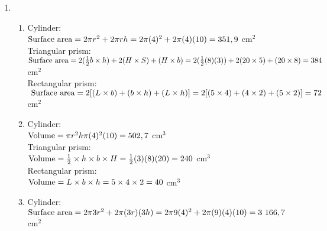  \begin{eocsolutions}{}{
\begin{enumerate}[itemsep=5pt, label=\textbf{\arabic*}. ] 
\item \begin{enumerate}[itemsep=5pt, label=\textbf{(\alph*)} ]
       \item Cylinder: \\
$\mbox{Surface area} = 2 \pi r^2 + 2 \pi rh \\
= 2 \pi (4)^2 + 2 \pi(4)(10) \\
= 351,9 ~$cm$^{2}$\\

Triangular prism:  \\
$\mbox{Surface area} = 2(\frac{1}{2}b \times h) + 2(H \times S) + (H \times b)\\
= 2(\frac{1}{2}(8)(3)) + 2(20 \times 5) + (20 \times 8)\\
= 384 ~$cm$^{2}$\\

Rectangular prism:\\
$\mbox{ Surface area} = 2[(L \times b) + (b \times h) + (L \times h)] \\
= 2[(5 \times 4) + (4 \times 2) + (5 \times 2)] \\
= 72 ~$cm$^{2}$

\item Cylinder: \\
$\mbox{Volume} = \pi r^2 h \\
\pi (4)^2(10)\\
= 502,7 ~$cm$^{3}$ \\

Triangular prism:  \\
$\mbox{Volume} = \frac{1}{2} \times h \times b \times H\\
= \frac{1}{2}(3)(8)(20)\\
= 240 ~$cm$^{3}$ \\

Rectangular prism:\\
$\mbox{Volume} = L \times b \times h\\
= 5 \times 4 \times 2 \\
= 40 ~ $cm$^{3}$ 

\item Cylinder: \\
$\mbox{Surface area} = 2 \pi 3r^2 + 2 \pi (3r)(3h) \\
= 2 \pi 9(4)^2 + 2 \pi(9)(4)(10) \\
= 3~166,7 ~$cm$^{2}$\\


\end{enumerate}
\end{enumerate}}
\end{eocsolutions}
